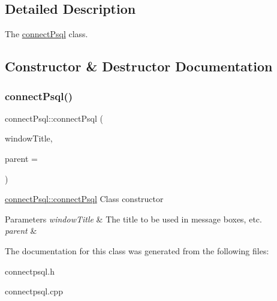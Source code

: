 \subsection{Detailed Description}
The \mbox{\hyperlink{classconnect_psql}{connect\+Psql}} class. 

\subsection{Constructor \& Destructor Documentation}
\mbox{\label{classconnect_psql_aee2b55cd64f5b2fac084eda4e6db0075}} 
\subsubsection{\texorpdfstring{connect\+Psql()}{connectPsql()}}
{\footnotesize\ttfamily connect\+Psql\+::connect\+Psql (\begin{DoxyParamCaption}\item[{Q\+String}]{window\+Title,  }\item[{Q\+Widget $\ast$}]{parent = {} }\end{DoxyParamCaption})\hspace{0.3cm}{\ttfamily [explicit]}}



\mbox{\hyperlink{classconnect_psql_aee2b55cd64f5b2fac084eda4e6db0075}{connect\+Psql\+::connect\+Psql}} Class constructor 


\begin{DoxyParams}{Parameters}
{\em window\+Title} & The title to be used in message boxes, etc. \\
\hline
{\em parent} & \\
\hline
\end{DoxyParams}


The documentation for this class was generated from the following files\+:\begin{DoxyCompactItemize}
\item 
connectpsql.\+h\item 
connectpsql.\+cpp\end{DoxyCompactItemize}
